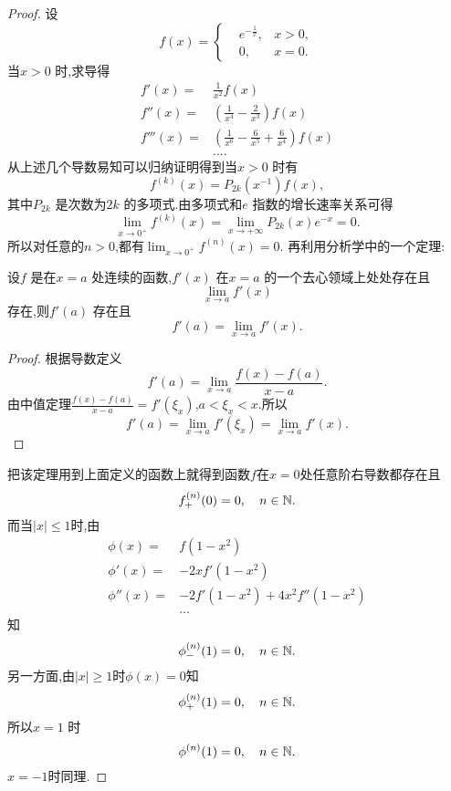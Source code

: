 \begin{proof}
  设
  \begin{equation*}
    f(x)=\left\{
      \begin{aligned}
	& e^{-\frac{1}{x}}, & x>0,\\
	& 0, & x=0.
      \end{aligned}\right.
  \end{equation*}
当$x>0$ 时,求导得
\begin{align*}
  f'(x)= & \frac{1}{x^2}f(x)\\
  f''(x)= & \left(\frac{1}{x^4}-\frac{2}{x^3}\right)f(x)\\
  f'''(x) = & \left( \frac{1}{x^{6}}-\frac{6}{x^{5}}+\frac{6}{x^{4}} \right) f(x)\\
  & \ldots
.\end{align*}
从上述几个导数易知可以归纳证明得到当$x>0$ 时有
\[
  f^{(k)}(x)=P_{2k}(x^{-1})f(x),
\] 
其中$P_{2k}$ 是次数为$2k$ 的多项式.由多项式和$e$ 指数的增长速率关系可得
\[
  \lim_{x\to 0^{+}}f^{(k)}(x)=\lim_{x\to+\infty}P_{2k}(x)e^{-x}=0.
\] 
所以对任意的$n>0$,都有$\lim_{x\to 0^{+}}f^{(n)}(x)=0$.
再利用分析学中的一个定理:
\begin{framed}
  \small\itshape 
  \begin{theorem} 设$f$ 是在$x=a$ 处连续的函数,$f'(x)$ 在$x=a$ 的一个去心领域上处处存在且
  \[
    \lim_{x\to a}f'(x)
  \] 
  存在,则$f'(a)$ 存在且
  \[
    f'(a)=\lim_{x\to a}f'(x).
  \] 
\end{theorem}
  \begin{proof}
    根据导数定义 
    \[
      f'(a)=\lim_{x\to a}\frac{f(x)-f(a)}{x-a}.
    \] 
    由中值定理$\frac{f(x)-f(a)}{x-a}=f'(\xi_x)$,$a<\xi_x<x$.所以
    \[
      f'(a)=\lim_{x\to a}f'(\xi_x)=\lim_{x\to a}f'(x).
    \] 
  \end{proof}
\end{framed}
把该定理用到上面定义的函数上就得到函数$f$在$x=0$处任意阶右导数都存在且
\[
  f^{(n)}_{+}(0)=0,\quad n\in \mathbb{N}.
\] 
而当$|x|\le 1$时,由
\begin{align*}
  \phi(x)=&f(1-x^2)\\
  \phi'(x)=&-2xf'(1-x^2)\\
  \phi''(x)=& -2f'(1-x^2)+4x^2f''(1-x^2)\\
	    &\ldots
\end{align*}
知
\[
  \phi^{(n)}_{-}(1)=0, \quad n\in \mathbb{N}.
\] 
另一方面,由$|x|\ge 1$时$\phi(x)=0$知
\[
  \phi^{(n)}_{+}(1)=0, \quad n\in \mathbb{N}.
\] 
所以$x=1$ 时
\[
  \phi^{(n)}(1)=0,\quad n\in \mathbb{N}.
\] 
$x=-1$时同理.

\end{proof}
